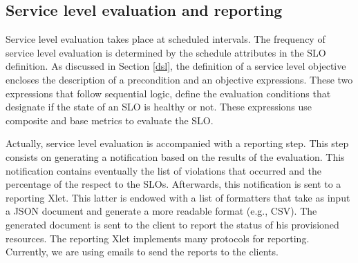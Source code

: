\subsection{Service level evaluation and reporting}

Service level evaluation takes place at scheduled intervals. The frequency of service level evaluation is determined by the schedule attributes in 
the SLO definition. As discussed in Section \ref{dsl}, the definition of a service level objective encloses the description of a precondition and an objective expressions. These 
two expressions that follow sequential logic, define the evaluation conditions that designate if the state of an SLO is healthy or not. These expressions use composite and base 
metrics to evaluate the SLO.

Actually, service level evaluation is accompanied with a reporting step. This step consists on generating a notification based on the results of the evaluation. This notification 
contains eventually the list of violations that occurred and the percentage of the respect to the SLOs. Afterwards, this notification is sent to a reporting Xlet. This latter is 
endowed with a list of formatters that take as input a JSON document and generate a more readable format (e.g., CSV). The generated document is sent to the client to report the 
status of his provisioned resources. The reporting Xlet implements many protocols for reporting. Currently, we are using emails to send the reports to the clients. 